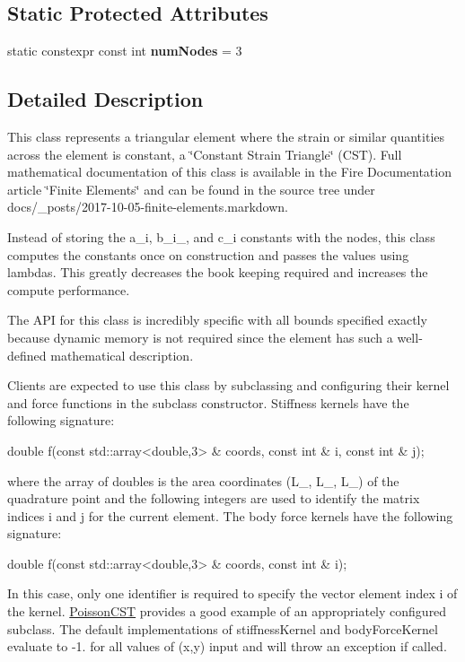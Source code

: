 \subsection*{Static Protected Attributes}
\begin{DoxyCompactItemize}
\item 
\mbox{\label{a00773_a3e23c9ef56fcb6641d5aa727370a827e}} 
static constexpr const int {\bfseries num\+Nodes} = 3
\end{DoxyCompactItemize}


\subsection{Detailed Description}
This class represents a triangular element where the strain or similar quantities across the element is constant, a \char`\"{}\+Constant Strain Triangle\char`\"{} (C\+ST). Full mathematical documentation of this class is available in the Fire Documentation article \char`\"{}\+Finite Elements\char`\"{} and can be found in the source tree under docs/\+\_\+posts/2017-\/10-\/05-\/finite-\/elements.\+markdown.

Instead of storing the a\+\_\+i, b\+\_\+i\+\_\+, and c\+\_\+i constants with the nodes, this class computes the constants once on construction and passes the values using lambdas. This greatly decreases the book keeping required and increases the compute performance.

The A\+PI for this class is incredibly specific with all bounds specified exactly because dynamic memory is not required since the element has such a well-\/defined mathematical description.

Clients are expected to use this class by subclassing and configuring their kernel and force functions in the subclass\textquotesingle{} constructor. Stiffness kernels have the following signature\+: 
\begin{DoxyCode}
\textcolor{keywordtype}{double} f(\textcolor{keyword}{const} std::array<double,3> & coords, \textcolor{keyword}{const} \textcolor{keywordtype}{int} & i,
\textcolor{keyword}{const} \textcolor{keywordtype}{int} & j);
\end{DoxyCode}
 where the array of doubles is the area coordinates (L\+\_, L\+\_, L\+\_) of the quadrature point and the following integers are used to identify the matrix indices i and j for the current element. The body force kernels have the following signature\+: 
\begin{DoxyCode}
\textcolor{keywordtype}{double} f(\textcolor{keyword}{const} std::array<double,3> & coords, \textcolor{keyword}{const} \textcolor{keywordtype}{int} & i);
\end{DoxyCode}
 In this case, only one identifier is required to specify the vector element index i of the kernel. \hyperlink{a00793}{Poisson\+C\+ST} provides a good example of an appropriately configured subclass. The default implementations of stiffness\+Kernel and body\+Force\+Kernel evaluate to -\/1. for all values of (x,y) input and will throw an exception if called.

